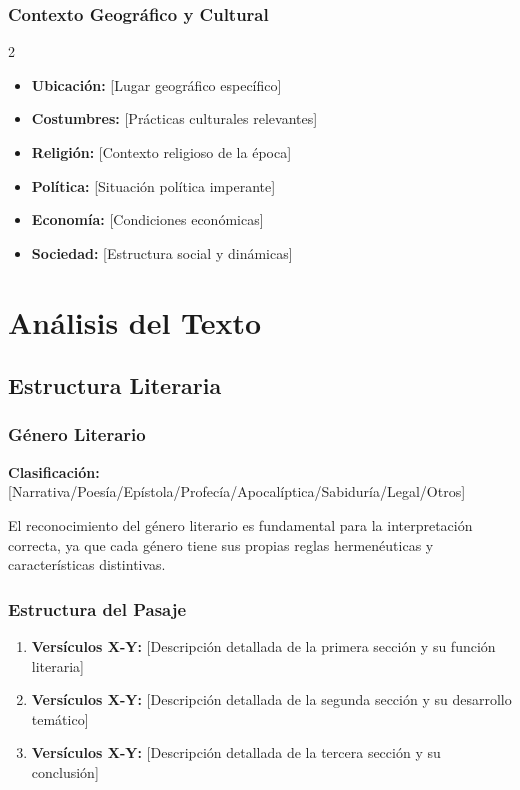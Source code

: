 \documentclass[12pt,a4paper]{article}
\begin{document}
\subsubsection{Contexto Geográfico y Cultural}

\begin{multicols}{2}
\begin{itemize}[leftmargin=*]
    \item \textbf{Ubicación:} [Lugar geográfico específico]
    \item \textbf{Costumbres:} [Prácticas culturales relevantes]
    \item \textbf{Religión:} [Contexto religioso de la época]
    \item \textbf{Política:} [Situación política imperante]
    \item \textbf{Economía:} [Condiciones económicas]
    \item \textbf{Sociedad:} [Estructura social y dinámicas]
\end{itemize}
\end{multicols}

\section{Análisis del Texto}

\subsection{Estructura Literaria}

\subsubsection{Género Literario}
\textbf{Clasificación:} [Narrativa/Poesía/Epístola/Profecía/Apocalíptica/Sabiduría/Legal/Otros]

El reconocimiento del género literario es fundamental para la interpretación correcta, ya que cada género tiene sus propias reglas hermenéuticas y características distintivas.

\subsubsection{Estructura del Pasaje}

\begin{enumerate}[leftmargin=*]
    \item \textbf{Versículos X-Y:} [Descripción detallada de la primera sección y su función literaria]
    \item \textbf{Versículos X-Y:} [Descripción detallada de la segunda sección y su desarrollo temático]  
    \item \textbf{Versículos X-Y:} [Descripción detallada de la tercera sección y su conclusión]
\end{enumerate}
\end{document}

